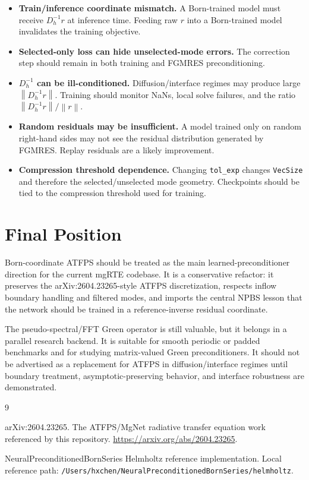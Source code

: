 \documentclass[11pt]{article}
\newcommand{\norm}[1]{\left\lVert #1 \right\rVert}
\begin{document}
\begin{itemize}[leftmargin=2em]
  \item \textbf{Train/inference coordinate mismatch.}
  A Born-trained model must receive \(D_h^{-1}r\) at inference time.  Feeding
  raw \(r\) into a Born-trained model invalidates the training objective.

  \item \textbf{Selected-only loss can hide unselected-mode errors.}
  The correction step should remain in both training and FGMRES
  preconditioning.

  \item \textbf{\(D_h^{-1}\) can be ill-conditioned.}
  Diffusion/interface regimes may produce large \(\norm{D_h^{-1}r}\).  Training
  should monitor NaNs, local solve failures, and the ratio
  \(\norm{D_h^{-1}r}/\norm{r}\).

  \item \textbf{Random residuals may be insufficient.}
  A model trained only on random right-hand sides may not see the residual
  distribution generated by FGMRES.  Replay residuals are a likely improvement.

  \item \textbf{Compression threshold dependence.}
  Changing \texttt{tol\_exp} changes \texttt{VecSize} and therefore the
  selected/unselected mode geometry.  Checkpoints should be tied to the
  compression threshold used for training.
\end{itemize}

\section{Final Position}

Born-coordinate ATFPS should be treated as the main learned-preconditioner
direction for the current mgRTE codebase.  It is a conservative refactor:
it preserves the arXiv:2604.23265-style ATFPS discretization, respects inflow
boundary handling and filtered modes, and imports the central NPBS lesson that
the network should be trained in a reference-inverse residual coordinate.

The pseudo-spectral/FFT Green operator is still valuable, but it belongs in a
parallel research backend.  It is suitable for smooth periodic or padded
benchmarks and for studying matrix-valued Green preconditioners.  It should not
be advertised as a replacement for ATFPS in diffusion/interface regimes until
boundary treatment, asymptotic-preserving behavior, and interface robustness
are demonstrated.

\begin{thebibliography}{9}

arXiv:2604.23265.
The ATFPS/MgNet radiative transfer equation work referenced by this repository.
\url{https://arxiv.org/abs/2604.23265}.

NeuralPreconditionedBornSeries Helmholtz reference implementation.
Local reference path:
\texttt{/Users/hxchen/NeuralPreconditionedBornSeries/helmholtz}.

\end{thebibliography}
\end{document}
